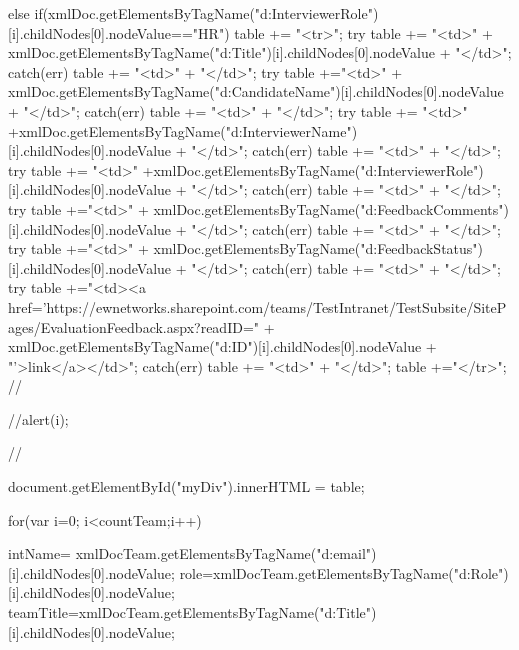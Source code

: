 {{{{{							} else if(xmlDoc.getElementsByTagName("d:InterviewerRole")[i].childNodes[0].nodeValue=="HR")
							{
								table += "<tr>";
								try{
									table += "<td>" + xmlDoc.getElementsByTagName("d:Title")[i].childNodes[0].nodeValue + "</td>";
								}
								catch(err)
								{
									table += "<td>" + "</td>";
								}
								try{
									table +="<td>" + xmlDoc.getElementsByTagName("d:CandidateName")[i].childNodes[0].nodeValue + "</td>";
								}
								catch(err)
								{
									table += "<td>" + "</td>";
								}
								try{
									table += "<td>" +xmlDoc.getElementsByTagName("d:InterviewerName")[i].childNodes[0].nodeValue + "</td>";
									}
								catch(err)
								{
									table += "<td>" + "</td>";
								}
								try{
								table += "<td>" +xmlDoc.getElementsByTagName("d:InterviewerRole")[i].childNodes[0].nodeValue + "</td>";
								}
								catch(err)
								{
									table += "<td>" + "</td>";
								}
								try{
								table +="<td>" + xmlDoc.getElementsByTagName("d:FeedbackComments")[i].childNodes[0].nodeValue + "</td>";
								}
								catch(err)
								{
									table += "<td>" + "</td>";
								}
								try {
								table +="<td>" + xmlDoc.getElementsByTagName("d:FeedbackStatus")[i].childNodes[0].nodeValue + "</td>";
								}
								catch(err)
								{
									table += "<td>" + "</td>";
								}
								try {
								table +="<td><a href='https://ewnetworks.sharepoint.com/teams/TestIntranet/TestSubsite/SitePages/EvaluationFeedback.aspx?readID=" + xmlDoc.getElementsByTagName("d:ID")[i].childNodes[0].nodeValue + "'>link</a></td>";
								}
								catch(err)
								{
									table += "<td>" + "</td>";
								}
								table +="</tr>";
							}
							//{
								//alert(i);
								
							//}	
						}
						
						
						document.getElementById("myDiv").innerHTML = table;
					}
         for(var i=0; i<countTeam;i++)
             {
                    intName= xmlDocTeam.getElementsByTagName("d:email")[i].childNodes[0].nodeValue;
                  role=xmlDocTeam.getElementsByTagName("d:Role")[i].childNodes[0].nodeValue;
                    teamTitle=xmlDocTeam.getElementsByTagName("d:Title")[i].childNodes[0].nodeValue;        
                  
}}}
